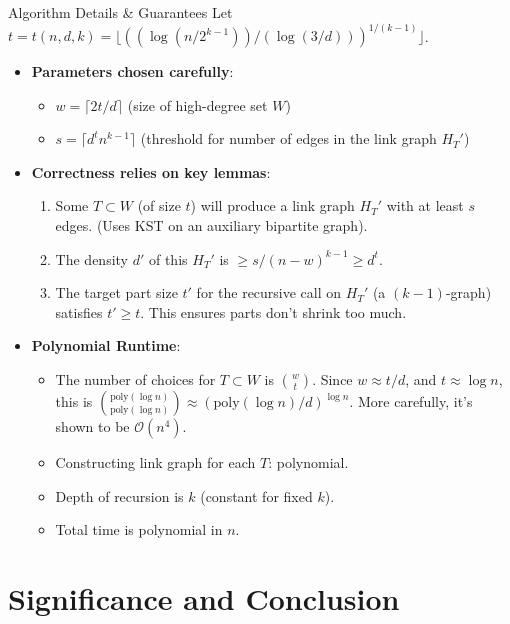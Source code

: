 \documentclass{beamer}
\newcommand{\bigO}[1]{\ensuremath{\mathcal{O}\left(#1\right)}}
\begin{document}
\begin{frame}{Algorithm Details & Guarantees}
  Let $t = t(n,d,k) = \lfloor ( (\log (n/2^{k-1})) / (\log (3/d)) )^{1/(k-1)} \rfloor$.
  \begin{itemize}
    \item \textbf{Parameters chosen carefully}:
    \begin{itemize}
        \item $w = \lceil 2t/d \rceil$ (size of high-degree set $W$)
        \item $s = \lceil d^t n^{k-1} \rceil$ (threshold for number of edges in the link graph $H_T'$)
    \end{itemize}
    \pause
    \item \textbf{Correctness relies on key lemmas}:
    \begin{enumerate}
        \item Some $T \subset W$ (of size $t$) will produce a link graph $H_T'$ with at least $s$ edges. (Uses KST on an auxiliary bipartite graph).
        \item The density $d'$ of this $H_T'$ is $\ge s/(n-w)^{k-1} \ge d^t$.
        \item The target part size $t'$ for the recursive call on $H_T'$ (a $(k-1)$-graph) satisfies $t' \ge t$. This ensures parts don't shrink too much.
    \end{enumerate}
    \pause
    \item \textbf{Polynomial Runtime}:
    \begin{itemize}
        \item The number of choices for $T \subset W$ is $\binom{w}{t}$. Since $w \approx t/d$, and $t \approx \log n$, this is $\binom{\text{poly}(\log n)}{\text{poly}(\log n)} \approx (\text{poly}(\log n)/d)^{\log n}$. More carefully, it's shown to be $\bigO{n^4}$.
        \item Constructing link graph for each $T$: polynomial.
        \item Depth of recursion is $k$ (constant for fixed $k$).
        \item Total time is polynomial in $n$.
    \end{itemize}
  \end{itemize}
\end{frame}

\section{Significance and Conclusion}
\end{document}
